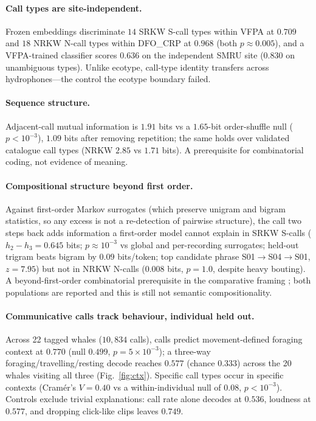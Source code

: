 \documentclass[11pt]{article}
\begin{document}
\paragraph{Call types are site-independent.} Frozen embeddings discriminate $14$ SRKW
S-call types within VFPA at $0.709$ and $18$ NRKW N-call types within DFO\_CRP at $0.968$
(both $p\approx0.005$), and a VFPA-trained classifier scores $0.636$ on the independent
SMRU site ($0.830$ on unambiguous types). Unlike ecotype, call-type identity transfers
across hydrophones---the control the ecotype boundary failed.

\paragraph{Sequence structure.} Adjacent-call mutual information is $1.91$ bits vs a
$1.65$-bit order-shuffle null ($p<10^{-3}$), $1.09$ bits after removing repetition; the same
holds over validated catalogue call types (NRKW $2.85$ vs $1.71$ bits). A prerequisite for
combinatorial coding, not evidence of meaning.

\paragraph{Compositional structure beyond first order.} Against first-order Markov surrogates
(which preserve unigram and bigram statistics, so any excess is not a re-detection of pairwise
structure), the call two steps back adds information a first-order model cannot explain in SRKW
S-calls ($h_2-h_3=0.645$ bits; $p\approx10^{-3}$ vs global and per-recording surrogates;
held-out trigram beats bigram by $0.09$ bits/token; top candidate phrase
S01$\to$S04$\to$S01, $z=7.95$) but not in NRKW N-calls ($0.008$ bits, $p=1.0$, despite heavy
bouting). A beyond-first-order combinatorial prerequisite in the comparative framing
\citep{sharma2024,berthet2025bonobo,crockford2025}; both populations are reported and this is still not
semantic compositionality.

\paragraph{Communicative calls track behaviour, individual held out.} Across 22 tagged
whales ($10{,}834$ calls), calls predict movement-defined foraging context at $0.770$
(null $0.499$, $p=5\times10^{-3}$); a three-way foraging/travelling/resting decode reaches
$0.577$ (chance $0.333$) across the 20 whales visiting all three (Fig.~\ref{fig:ctx}).
Specific call types occur in specific contexts (Cram\'er's $V=0.40$ vs a within-individual
null of $0.08$, $p<10^{-3}$). Controls exclude trivial explanations: call rate alone decodes
at $0.536$, loudness at $0.577$, and dropping click-like clips leaves $0.749$.
\end{document}
